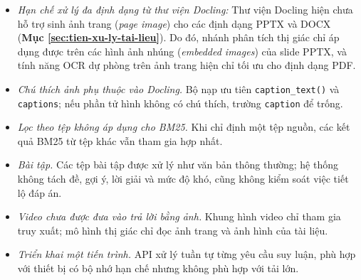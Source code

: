 \begin{itemize}
    \item \emph{Hạn chế xử lý đa định dạng từ thư viện Docling:} Thư viện Docling hiện chưa hỗ trợ sinh ảnh trang (\textit{page image}) cho các định dạng PPTX và DOCX (\textbf{Mục \ref{sec:tien-xu-ly-tai-lieu}}). Do đó, nhánh phân tích thị giác chỉ áp dụng được trên các hình ảnh nhúng (\textit{embedded images}) của slide PPTX, và tính năng OCR dự phòng trên ảnh trang hiện chỉ tối ưu cho định dạng PDF.
    \item \emph{Chú thích ảnh phụ thuộc vào Docling.} Bộ nạp ưu tiên \texttt{caption\_text()} và \texttt{captions}; nếu phần tử hình không có chú thích, trường \texttt{caption} để trống.
    \item \emph{Lọc theo tệp không áp dụng cho BM25.} Khi chỉ định một tệp nguồn, các kết quả BM25 từ tệp khác vẫn tham gia hợp nhất.
    \item \emph{Bài tập.} Các tệp bài tập được xử lý như văn bản thông thường; hệ thống không tách đề, gợi ý, lời giải và mức độ khó, cũng không kiểm soát việc tiết lộ đáp án.
    \item \emph{Video chưa được đưa vào trả lời bằng ảnh.} Khung hình video chỉ tham gia truy xuất; mô hình thị giác chỉ đọc ảnh trang và ảnh hình của tài liệu.
    \item \emph{Triển khai một tiến trình.} API xử lý tuần tự từng yêu cầu suy luận, phù hợp với thiết bị có bộ nhớ hạn chế nhưng không phù hợp với tải lớn.
\end{itemize}
